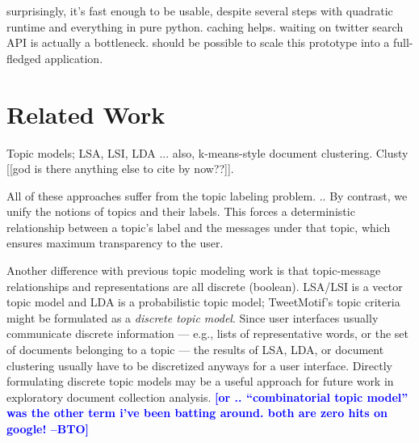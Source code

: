 \documentclass[letterpaper]{article}
\newcommand{\bto}[1]{\textcolor{blue}{\textbf{[#1 --BTO]}}}
\begin{document}
surprisingly, it's fast enough to be usable, despite several steps with quadratic runtime and everything in pure python.  caching helps.  waiting on twitter search API is actually a bottleneck.  should be possible to scale this prototype into a full-fledged application.

\section{Related Work}

Topic models; LSA, LSI, LDA ... also, k-means-style document clustering.  Clusty [[god is there anything else to cite by now??]].

All of these approaches suffer from the topic labeling problem. ..  By contrast, we unify the notions of topics and their labels.  This forces a deterministic relationship between a topic's label and the messages under that topic, which ensures maximum transparency to the user.

Another difference with previous topic modeling work is that topic-message relationships and representations are all discrete (boolean).  LSA/LSI is a vector topic model and LDA is a probabilistic topic model; TweetMotif's topic criteria might be formulated as a \emph{discrete topic model}.  Since user interfaces usually communicate discrete information --- e.g., lists of representative words, or the set of documents belonging to a topic --- the results of LSA, LDA, or document clustering usually have to be discretized anyways for a user interface.  Directly formulating discrete topic models may be a useful approach for future work in exploratory document collection analysis.  \bto{or .. ``combinatorial topic model'' was the other term i've been batting around.  both are zero hits on google!}




\end{document}
